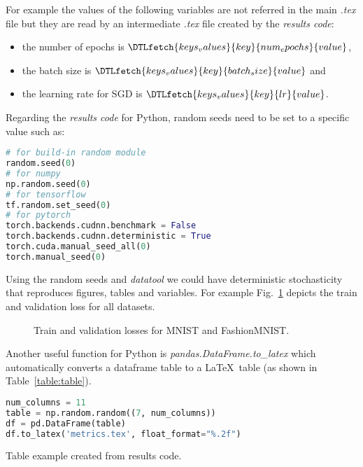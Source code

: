 \documentclass[journal]{IEEEtran}
\begin{document}
For example the values of the following variables are not referred in the main \textit{.tex} file but they are read by an intermediate \textit{.tex} file created by the \textit{results code}:
\begin{itemize}
	\item the number of epochs is $\DTLfetch{keys_values}{key}{num_epochs}{value}$,
	\item the batch size is $\DTLfetch{keys_values}{key}{batch_size}{value}$ and
	\item the learning rate for SGD is $\DTLfetch{keys_values}{key}{lr}{value}$.
\end{itemize}

Regarding the \textit{results code} for Python, random seeds need to be set to a specific value such as:
\begin{lstlisting}[language=python, style=lststyle, caption={Python reproducibility commands for some popular libraries.}, captionpos=b]
# for build-in random module
random.seed(0)
# for numpy
np.random.seed(0)
# for tensorflow
tf.random.set_seed(0)
# for pytorch
torch.backends.cudnn.benchmark = False
torch.backends.cudnn.deterministic = True
torch.cuda.manual_seed_all(0)
torch.manual_seed(0)
\end{lstlisting}

Using the random seeds and \textit{datatool} we could have deterministic stochasticity that reproduces figures, tables and variables.
For example Fig.~\ref{fig:image} depicts the train and validation loss for all datasets.
\begin{figure}[!t]
	\caption{Train and validation losses for MNIST and FashionMNIST.}
	\label{fig:image}
\end{figure}

Another useful function for Python is \textit{pandas.DataFrame.to\_latex} which automatically converts a dataframe table to a \LaTeX\ table (as shown in Table~\ref{table:table}).

\begin{lstlisting}[language=python, style=lststyle, caption={Convert Pandas DataFrame to \LaTeX\ table.}, captionpos=b]
num_columns = 11
table = np.random.random((7, num_columns))
df = pd.DataFrame(table)
df.to_latex('metrics.tex', float_format="%.2f")
\end{lstlisting}

\begin{table}[h]
	\centering
	\caption{Table example created from results code.}
	\label{table:table}
	\setlength\tabcolsep{4.2pt}
	\scalebox{0.72}{}
\end{table}
\end{document}
